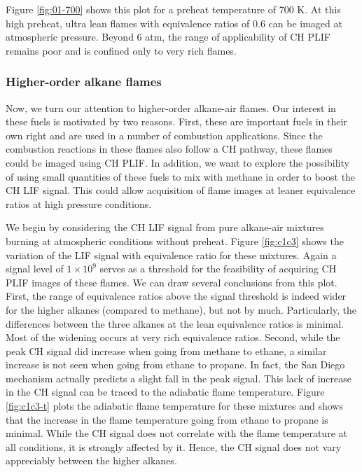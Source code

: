 

Figure \ref{fig:01-700} shows this plot for a preheat temperature of 700 K.
At this high preheat, ultra lean flames with equivalence ratios of 0.6 can be imaged at atmospheric pressure.
Beyond 6 atm, the range of applicability of CH PLIF remains poor and is confined only to very rich flames.



\subsubsection{Higher-order alkane flames}

Now, we turn our attention to higher-order alkane-air flames.
Our interest in these fuels is motivated by two reasons.
First, these are important fuels in their own right and are used in a number of combustion applications.
Since the combustion reactions in these flames also follow a CH pathway, these flames could be imaged using CH PLIF.
In addition, we want to explore the possibility of using small quantities of these fuels to mix with methane in order to boost the CH LIF signal.
This could allow acquisition of flame images at leaner equivalence ratios at high pressure conditions.

We begin by considering the CH LIF signal from pure alkane-air mixtures burning at atmospheric conditions without preheat.
Figure \ref{fig:c1c3} shows the variation of the LIF signal with equivalence ratio for these mixtures.
Again a signal level of \(1\times10^9\) serves as a threshold for the feasibility of acquiring CH PLIF images of these flames.
We can draw several conclusions from this plot.
First, the range of equivalence ratios above the signal threshold is indeed wider for the higher alkanes (compared to methane), but not by much.
Particularly, the differences between the three alkanes at the lean equivalence ratios is minimal.
Most of the widening occurs at very rich equivalence ratios.
Second, while the peak CH signal did increase when going from methane to ethane, a similar increase is not seen when going from ethane to propane.
In fact, the San Diego mechanism actually predicts a slight fall in the peak signal.
This lack of increase in the CH signal can be traced to the adiabatic flame temperature.
Figure \ref{fig:c1c3-t} plots the adiabatic flame temperature for these mixtures and shows that the increase in the flame temperature going from ethane to propane is minimal.
While the CH signal does not correlate with the flame temperature at all conditions, it is strongly affected by it.
Hence, the CH signal does not vary appreciably between the higher alkanes.

